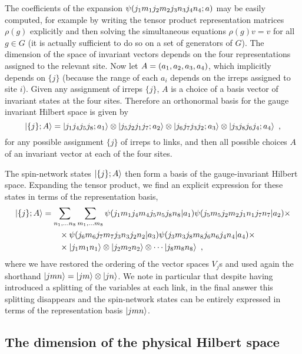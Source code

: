 The coefficients of the expansion $\psi\pqty{j_1 m_1 j_2 m_2 j_3 n_3 j_4 n_4 ; a}$ may be easily computed, for example by writing the tensor product representation matrices $\rho(g)$ explicitly and then solving the simultaneous equations $\rho(g) v = v$ for all $g \in G$ (it is actually sufficient to do so on a set of generators of $G$).
The dimension of the space of invariant vectors depends on the four representations assigned to the relevant site.
Now let $A = \pqty{a_1, a_2, a_3, a_4}$, which implicitly depends on $\{j\}$ (because the range of each $a_i$ depends on the irreps assigned to site $i$).
Given any assignment of irreps $\{j\}$, $A$ is a choice of a basis vector of invariant states at the four sites.
Therefore an orthonormal basis for the gauge invariant Hilbert space is given by
\begin{equation}
    \ket{ \{j\};A} = \ket{j_1 j_4 j_5 j_8 ; a_1} \otimes \ket{j_5 j_2 j_1 j_7 ; a_2} \otimes \ket{j_6 j_7 j_3 j_2 ; a_3} \otimes \ket{j_3 j_8 j_6 j_4 ; a_4} \ ,
\end{equation}
for any possible assignment $\{j\}$ of irreps to links, and then all possible choices $A$ of an invariant vector at each of the four sites.

The spin-network states $\ket{ \{j\};A}$ then form a basis of the gauge-invariant Hilbert space.
Expanding the tensor product, we find an explicit expression for these states in terms of the representation basis,
\begin{align}
    \ket{ \{j\};A} &= \sum_{n_1, \ldots n_8} \sum_{m_1, \ldots m_8} \psi\pqty{j_1 m_1 j_4 m_4 j_5 n_5 j_8 n_8 | a_1} \psi\pqty{j_5 m_5 j_2 m_2 j_1 n_1 j_7 n_7 | a_2} \times \\
    &\quad \quad \times \psi\pqty{j_6 m_6 j_7 m_7 j_3 n_3 j_2 n_2 | a_3} \psi\pqty{j_3 m_3 j_8 m_8 j_6 n_6 j_4 n_4 | a_4} \times \\
    &\quad \quad \times \ket{j_1 m_1 n_1} \otimes \ket{j_2 m_2 n_2} \otimes \cdots \ket{j_8 m_8 n_8} \ ,
\end{align}
where we have restored the ordering of the vector spaces $V_j$s and used again the shorthand $\ket{jmn}=\ket{jm}\otimes \ket{jn}$.
We note in particular that despite having introduced a splitting of the variables at each link, in the final answer this splitting disappears and the spin-network states can be entirely expressed in terms of the representation basis $\ket{jmn}$.

\subsection{The dimension of the physical Hilbert space}\label{sec:spin networks dimension}

